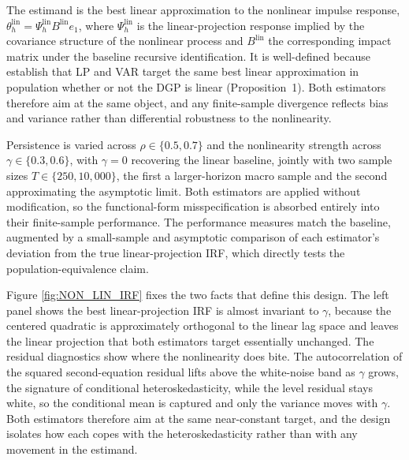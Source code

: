The estimand is the best linear approximation to the nonlinear impulse response,
$\theta_h^{\mathrm{lin}} = \Psi_h^{\mathrm{lin}} B^{\mathrm{lin}} e_1$, where
$\Psi_h^{\mathrm{lin}}$ is the linear-projection response implied by the covariance structure of
the nonlinear process and $B^{\mathrm{lin}}$ the corresponding impact matrix under the baseline
recursive identification. It is well-defined because \textcite{plagborg2021local} establish that
LP and VAR target the same best linear approximation in population whether or not the DGP is
linear (Proposition~1). Both estimators therefore aim at the same object, and any finite-sample
divergence reflects bias and variance rather than differential robustness to the nonlinearity.

Persistence is varied across $\rho \in \{0.5, 0.7\}$ and the nonlinearity strength across
$\gamma \in \{0.3, 0.6\}$, with $\gamma=0$ recovering the linear baseline, jointly with two sample
sizes $T \in \{250, 10{,}000\}$, the first a larger-horizon macro sample and the second approximating the
asymptotic limit. Both estimators are applied without modification, so the functional-form
misspecification is absorbed entirely into their finite-sample performance. The performance
measures match the baseline, augmented by a small-sample and asymptotic comparison of each
estimator's deviation from the true linear-projection IRF, which directly tests the
population-equivalence claim.

Figure \ref{fig:NON_LIN_IRF} fixes the two facts that define this design. The left panel shows the
best linear-projection IRF is almost invariant to $\gamma$, because the centered quadratic is
approximately orthogonal to the linear lag space and leaves the linear projection that both
estimators target essentially unchanged. The residual diagnostics show where the nonlinearity does
bite. The autocorrelation of the squared second-equation residual lifts above the white-noise band
as $\gamma$ grows, the signature of conditional heteroskedasticity, while the level residual stays
white, so the conditional mean is captured and only the variance moves with $\gamma$. Both
estimators therefore aim at the same near-constant target, and the design isolates how each copes
with the heteroskedasticity rather than with any movement in the estimand.


